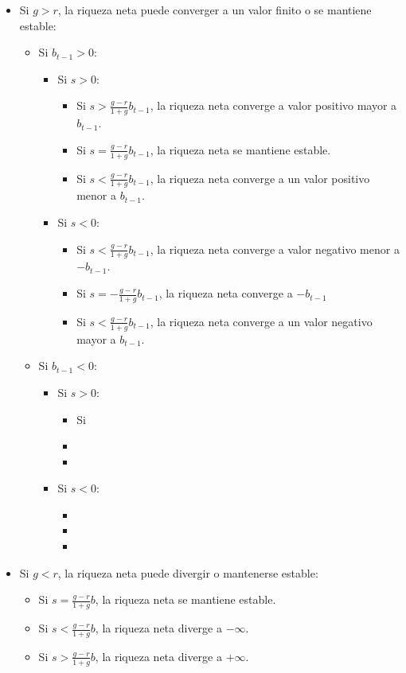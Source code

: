 \documentclass{nuevotema}
\begin{document}
\begin{itemize}
	\item Si $g > r$, la riqueza neta puede converger a un valor finito o se mantiene estable:
	\begin{itemize}
		\item Si $b_{t-1} > 0$:
		\begin{itemize}
			\item Si $s>0$:
			\begin{itemize}
				\item Si $s > \frac{g-r}{1+g}b_{t-1}$, la riqueza neta converge a valor positivo mayor a $b_{t-1}$.
				\item Si $s = \frac{g-r}{1+g}b_{t-1}$, la riqueza neta se mantiene estable.
				\item Si $s < \frac{g-r}{1+g}b_{t-1}$, la riqueza neta converge a un valor positivo menor a $b_{t-1}$.
			\end{itemize}
			\item Si $s<0$:
			\begin{itemize}
				\item Si $s < \frac{g-r}{1+g}b_{t-1}$, la riqueza neta converge a valor negativo menor a $-b_{t-1}$.
				\item Si $s = - \frac{g-r}{1+g}b_{t-1}$, la riqueza neta converge a $-b_{t-1}$
				\item Si $s < \frac{g-r}{1+g}b_{t-1}$, la riqueza neta converge a un valor negativo mayor a $b_{t-1}$.
			\end{itemize}
		\end{itemize}
		
		\item Si $b_{t-1} < 0$:
		\begin{itemize}
			\item Si $s > 0$:
			\begin{itemize}
				\item Si 
				\item
				\item
			\end{itemize}
			\item Si $s < 0$:
			\begin{itemize}
				\item 
				\item
				\item
			\end{itemize}
		\end{itemize}
	
	\end{itemize}
	
	\item Si $g<r$, la riqueza neta puede divergir o mantenerse estable:
	\begin{itemize}
	\item Si $s = \frac{g-r}{1+g} b$, la riqueza neta se mantiene estable.
	\item Si $s < \frac{g-r}{1+g} b$, la riqueza neta diverge a $-\infty$.
	\item Si $s > \frac{g-r}{1+g} b$, la riqueza neta diverge a $+\infty$. 
	\end{itemize}
\end{itemize}
\end{document}
